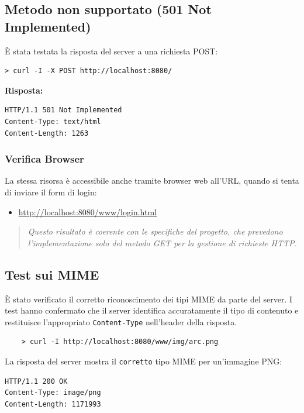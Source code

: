 \documentclass[a4paper,12pt]{report}
\begin{document}
\subsection{Metodo non supportato (501 Not Implemented)}
È stata testata la risposta del server a una richiesta POST:
\begin{verbatim}
> curl -I -X POST http://localhost:8080/
\end{verbatim}

\textbf{Risposta:}
\begin{verbatim}
HTTP/1.1 501 Not Implemented
Content-Type: text/html
Content-Length: 1263
\end{verbatim}

\subsubsection{Verifica Browser}
La stessa risorsa è accessibile anche tramite browser web all'URL, quando si tenta di inviare il form di login:
\begin{itemize}
	\item \url{http://localhost:8080/www/login.html}
\end{itemize}

\vspace{0.5cm}

\begin{quote}
	\textit{Questo risultato è coerente con le specifiche del progetto, che prevedono l'implementazione solo del metodo GET per
		la gestione di richieste HTTP.}
\end{quote}

\subsection{Test sui MIME}
È stato verificato il corretto riconoscimento dei tipi MIME da parte del server. I test hanno confermato che il server
identifica accuratamente il tipo di contenuto e restituisce l'appropriato \texttt{Content-Type} nell'header della risposta.

\begin{verbatim}
    > curl -I http://localhost:8080/www/img/arc.png
\end{verbatim}

\noindent La risposta del server mostra il \texttt{corretto} tipo MIME per un'immagine PNG:
\begin{verbatim}
HTTP/1.1 200 OK
Content-Type: image/png
Content-Length: 1171993
\end{verbatim}
\end{document}
